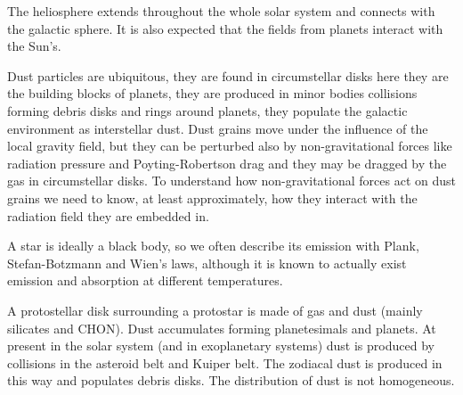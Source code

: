 \documentclass[12pt,a4paper]{article}
\begin{document}
The heliosphere extends throughout the whole solar system and connects with the galactic sphere. It is also expected that the fields from planets interact with the Sun's.
\vspace{10mm}

Dust particles are ubiquitous, they are found in circumstellar disks here they are the building blocks of planets, they are produced in minor bodies collisions forming debris disks and rings around planets, they populate the galactic environment as interstellar dust. Dust grains move under the influence of the local gravity field, but they can be perturbed also by non-gravitational forces like radiation pressure and Poyting-Robertson drag and they may be dragged by the gas in circumstellar disks. To understand how non-gravitational forces act on dust grains we need to know, at least approximately, how they interact with the radiation field they are embedded in.

A star is ideally a black body, so we often describe its emission with Plank, Stefan-Botzmann and Wien's laws, although it is known to actually exist emission and absorption at different temperatures.

A protostellar disk surrounding a protostar is made of gas and dust (mainly silicates and CHON). Dust accumulates forming planetesimals and planets. At present in the solar system (and in exoplanetary systems) dust is produced by collisions in the asteroid belt and Kuiper belt. The zodiacal dust is produced in this way and populates debris disks. The distribution of dust is not homogeneous.
\end{document}
